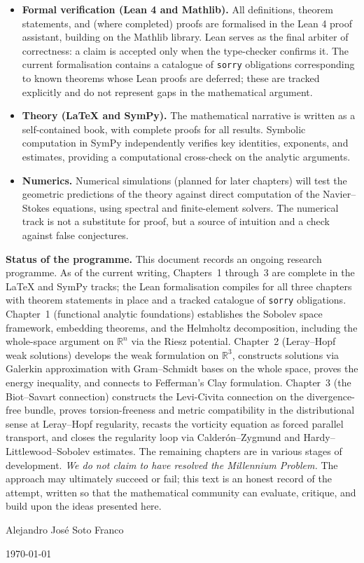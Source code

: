 \begin{itemize}
  \item \textbf{Formal verification (Lean 4 and Mathlib).}
    All definitions, theorem statements, and (where completed) proofs are
    formalised in the Lean 4 proof assistant, building on the Mathlib
    library.  Lean serves as the final arbiter of correctness: a claim
    is accepted only when the type-checker confirms it.  The current
    formalisation contains a catalogue of \texttt{sorry} obligations
    corresponding to known theorems whose Lean proofs are deferred;
    these are tracked explicitly and do not represent gaps in the
    mathematical argument.

  \item \textbf{Theory (\LaTeX{} and SymPy).}
    The mathematical narrative is written as a self-contained book,
    with complete proofs for all results.  Symbolic computation in SymPy
    independently verifies key identities, exponents, and estimates,
    providing a computational cross-check on the analytic arguments.

  \item \textbf{Numerics.}
    Numerical simulations (planned for later chapters) will test the
    geometric predictions of the theory against direct computation of
    the Navier--Stokes equations, using spectral and finite-element
    solvers.  The numerical track is not a substitute for proof, but
    a source of intuition and a check against false conjectures.
\end{itemize}

\textbf{Status of the programme.}
This document records an ongoing research programme.  As of the current
writing, Chapters~1 through~3 are complete in the \LaTeX{} and SymPy
tracks; the Lean formalisation compiles for all three chapters with
theorem statements in place and a tracked catalogue of \texttt{sorry}
obligations.
Chapter~1 (functional analytic foundations) establishes the Sobolev space
framework, embedding theorems, and the Helmholtz decomposition, including
the whole-space argument on $\mathbb{R}^{n}$ via the Riesz potential.
Chapter~2 (Leray--Hopf weak solutions) develops the weak formulation on
$\mathbb{R}^{3}$, constructs solutions via Galerkin approximation with
Gram--Schmidt bases on the whole space, proves the energy inequality, and
connects to Fefferman's Clay formulation.
Chapter~3 (the Biot--Savart connection) constructs the Levi-Civita
connection on the divergence-free bundle, proves torsion-freeness and
metric compatibility in the distributional sense at Leray--Hopf
regularity, recasts the vorticity equation as forced parallel transport,
and closes the regularity loop via Calder\'{o}n--Zygmund and
Hardy--Littlewood--Sobolev estimates.  The remaining chapters are in
various stages of development.  \emph{We do not claim to have resolved the Millennium
Problem.}  The approach may ultimately succeed or fail; this text is an
honest record of the attempt, written so that the mathematical community
can evaluate, critique, and build upon the ideas presented here.

\bigskip

\hfill Alejandro Jos\'e Soto Franco

\hfill \today
